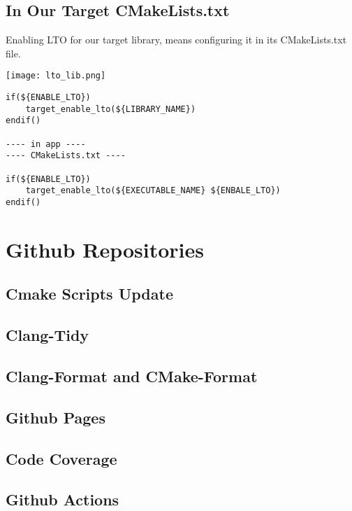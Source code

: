 \subsection{In Our Target CMakeLists.txt}

Enabling LTO for our target library, means configuring it in its CMakeLists.txt file.

\begin{center}
    \texttt{[image: lto\_lib.png]}
\end{center}


\begin{verbatim}
if(${ENABLE_LTO})
    target_enable_lto(${LIBRARY_NAME})
endif()

---- in app ----
---- CMakeLists.txt ----

if(${ENABLE_LTO})
    target_enable_lto(${EXECUTABLE_NAME} ${ENBALE_LTO})
endif()
\end{verbatim}


\section{Github Repositories}


\subsection{Cmake Scripts Update}


\subsection{Clang-Tidy}

 
\subsection{Clang-Format and CMake-Format}


\subsection{Github Pages}


\subsection{Code Coverage}


\subsection{Github Actions}


